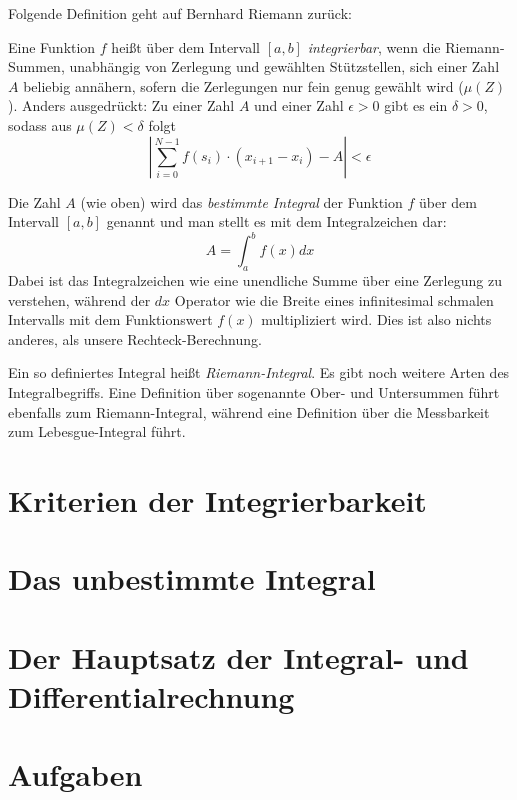 Folgende Definition geht auf Bernhard Riemann zurück:

\begin{definition}
Eine Funktion $f$ heißt über dem Intervall $[a,b]$ \emph{integrierbar}, wenn die Riemann-Summen, unabhängig von Zerlegung und gewählten Stützstellen, sich einer Zahl $A$ beliebig annähern, sofern die Zerlegungen nur fein genug gewählt wird ($\mu(Z)$). Anders ausgedrückt: Zu einer Zahl $A$ und einer Zahl $\epsilon >0$ gibt es ein $\delta >0$, sodass aus $\mu(Z)<\delta$ folgt
\begin{equation}
\left| \sum_{i=0}^{N-1} f(s_i)\cdot (x_{i+1}-x_i) -A \right| < \epsilon
\end{equation}
\end{definition}

\begin{definition}
Die Zahl $A$ (wie oben) wird das \emph{bestimmte Integral} der Funktion $f$ über dem Intervall $[a,b]$ genannt und man stellt es mit dem Integralzeichen dar:
\begin{equation}
A = \int_{a}^{b} f(x) dx
\end{equation}
Dabei ist das Integralzeichen wie eine unendliche Summe über eine Zerlegung zu verstehen, während der $dx$ Operator wie die Breite eines infinitesimal schmalen Intervalls mit dem Funktionswert $f(x)$ multipliziert wird. Dies ist also nichts anderes, als unsere Rechteck-Berechnung.
\end{definition}

Ein so definiertes Integral heißt \emph{Riemann-Integral}. Es gibt noch weitere Arten des Integralbegriffs. Eine Definition über sogenannte Ober- und Untersummen führt ebenfalls zum Riemann-Integral, während eine Definition über die Messbarkeit zum Lebesgue-Integral führt.

\section{Kriterien der Integrierbarkeit}

\section{Das unbestimmte Integral}

\section{Der Hauptsatz der Integral- und Differentialrechnung}



\section{Aufgaben}